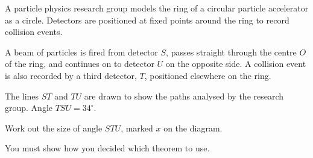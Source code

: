 \begin{question}
\noindent A particle physics research group models the ring of a circular particle accelerator as a circle. Detectors are positioned at fixed points around the ring to record collision events.

A beam of particles is fired from detector $S$, passes straight through the centre $O$ of the ring, and continues on to detector $U$ on the opposite side. A collision event is also recorded by a third detector, $T$, positioned elsewhere on the ring.

The lines $ST$ and $TU$ are drawn to show the paths analysed by the research group. Angle $TSU = 34^\circ$.

\begin{center}
\end{center}

\noindent Work out the size of angle $STU$, marked $x$ on the diagram.

\vspace{1cm}
\noindent You must show how you decided which theorem to use.
\vspace{5cm}

\begin{flushright}
\end{flushright}
\end{question}
